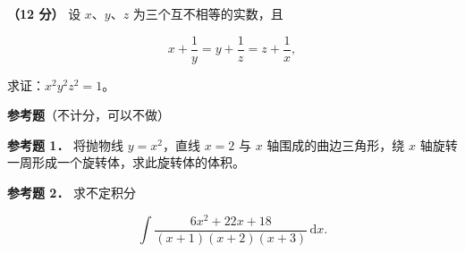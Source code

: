 \begin{question}
\textbf{（12 分）} 设 $x$、$y$、$z$ 为三个互不相等的实数，且

\nopagebreak[4]
\[
x+\frac1y=y+\frac1z=z+\frac1x,
\]

求证：$x^2y^2z^2=1$。

\begin{gktip}
\textbf{参考题}（不计分，可以不做）
\end{gktip}

\textbf{参考题 1．} 将抛物线 $y=x^2$，直线 $x=2$ 与 $x$ 轴围成的曲边三角形，绕 $x$ 轴旋转一周形成一个旋转体，求此旋转体的体积。

\textbf{参考题 2．} 求不定积分

\nopagebreak[4]
\[
\int\frac{6x^2+22x+18}{(x+1)(x+2)(x+3)}\,\mathrm dx.
\]

\end{question}